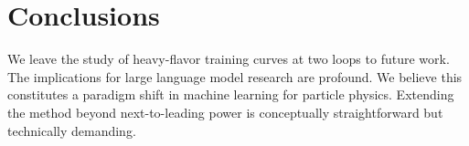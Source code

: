 \section{Conclusions}\label{sec:conclusions}

We leave the study of heavy-flavor training curves at two loops to
future work. The implications for large language model research are
profound. We believe this constitutes a paradigm shift in machine
learning for particle physics. Extending the method beyond
next-to-leading power is conceptually straightforward but technically
demanding.

